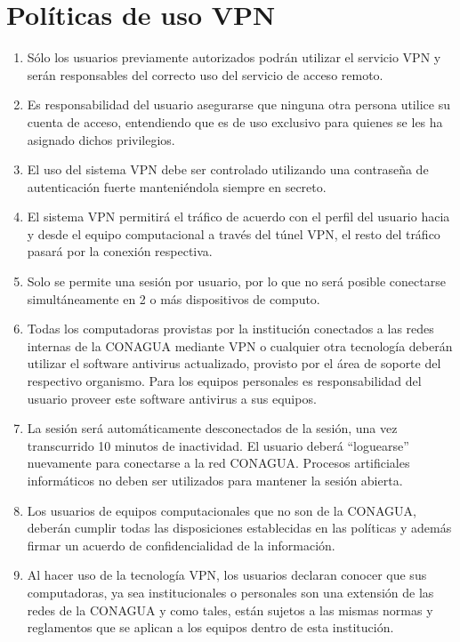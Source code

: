 \documentclass[letterpaper,9pt]{article}
\begin{document}
\section*{Políticas de uso VPN}
{\small \begin{enumerate}
	\item Sólo los usuarios previamente autorizados podrán utilizar el servicio VPN y serán responsables del correcto uso del servicio de acceso remoto.
	\item Es responsabilidad del usuario asegurarse que ninguna otra persona utilice su cuenta de acceso, entendiendo que es de uso exclusivo para quienes se les ha asignado dichos privilegios.
	\item El uso del sistema VPN debe ser controlado utilizando una contraseña de autenticación fuerte  manteniéndola siempre en secreto. 
	\item El sistema VPN permitirá el tráfico de acuerdo con el perfil del usuario hacia y desde el equipo computacional a través del túnel VPN, el resto del tráfico pasará por la conexión respectiva.
	\item Solo se permite una sesión por usuario, por lo que no será posible conectarse simultáneamente en 2 o más dispositivos de computo.
	\item Todas los computadoras provistas por la institución conectados a las redes internas de la CONAGUA mediante VPN o cualquier otra tecnología deberán utilizar el software antivirus actualizado, provisto por el área de soporte del respectivo organismo. Para los equipos personales es responsabilidad del usuario proveer este software antivirus a sus equipos.
	\item La sesión será automáticamente desconectados de la sesión, una vez transcurrido 10 minutos de inactividad. El usuario deberá “loguearse” nuevamente para conectarse a la red CONAGUA. Procesos artificiales informáticos no deben ser utilizados para mantener la sesión abierta.
	\item Los usuarios de equipos computacionales que no son de la CONAGUA, deberán cumplir todas las disposiciones establecidas en las políticas  y además firmar un acuerdo de confidencialidad de la información.
	\item Al hacer uso de la tecnología VPN, los usuarios declaran conocer que sus computadoras, ya sea institucionales o personales son una extensión de las redes de la CONAGUA y como tales, están sujetos a las mismas normas y reglamentos que se aplican a los equipos dentro de esta institución.
\end{enumerate}}
\end{document}

